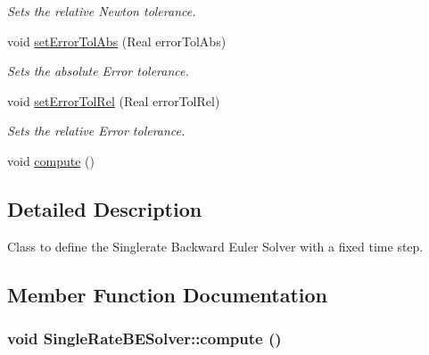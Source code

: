 \begin{DoxyCompactItemize}
\begin{DoxyCompactList}\small\item\em Sets the relative Newton tolerance. \item\end{DoxyCompactList}\item 
\hypertarget{classSingleRateBESolver_ad7ca632b547b8073edaf4f053d468783}{
void \hyperlink{classSingleRateBESolver_ad7ca632b547b8073edaf4f053d468783}{setErrorTolAbs} (Real errorTolAbs)}
\label{classSingleRateBESolver_ad7ca632b547b8073edaf4f053d468783}

\begin{DoxyCompactList}\small\item\em Sets the absolute Error tolerance. \item\end{DoxyCompactList}\item 
\hypertarget{classSingleRateBESolver_ac271921479ec7d9f2c676a7130f70624}{
void \hyperlink{classSingleRateBESolver_ac271921479ec7d9f2c676a7130f70624}{setErrorTolRel} (Real errorTolRel)}
\label{classSingleRateBESolver_ac271921479ec7d9f2c676a7130f70624}

\begin{DoxyCompactList}\small\item\em Sets the relative Error tolerance. \item\end{DoxyCompactList}\item 
void \hyperlink{classSingleRateBESolver_afafbf5018389e64522ba27b4855fbba9}{compute} ()
\end{DoxyCompactItemize}


\subsection{Detailed Description}
Class to define the Singlerate Backward Euler Solver with a fixed time step. 

\subsection{Member Function Documentation}
\hypertarget{classSingleRateBESolver_afafbf5018389e64522ba27b4855fbba9}{
\subsubsection[{compute}]{\setlength{\rightskip}{0pt plus 5cm}void SingleRateBESolver::compute ()}}
\label{classSingleRateBESolver_afafbf5018389e64522ba27b4855fbba9}


